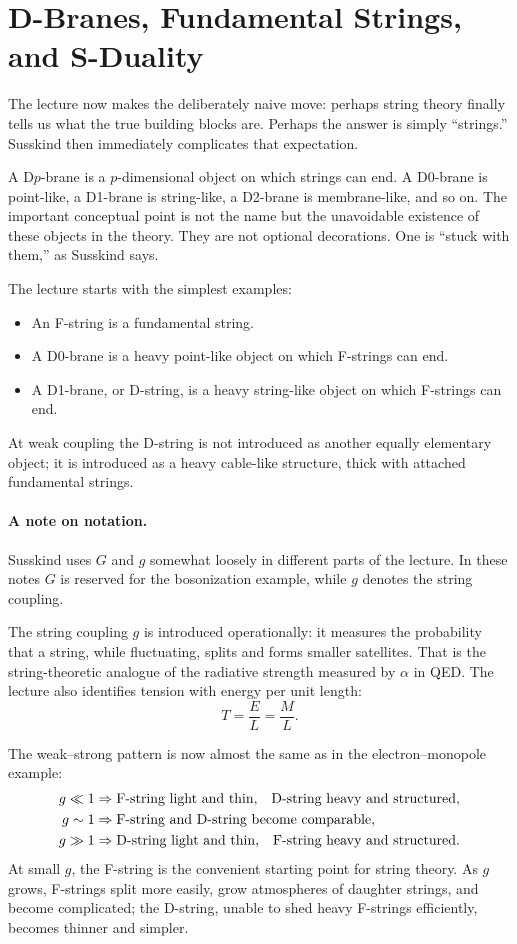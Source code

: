 \section{D-Branes, Fundamental Strings, and S-Duality}

The lecture now makes the deliberately naive move: perhaps string theory finally tells us what the true building blocks are. Perhaps the answer is simply ``strings.'' Susskind then immediately complicates that expectation.

A D\(p\)-brane is a \(p\)-dimensional object on which strings can end. A D0-brane is point-like, a D1-brane is string-like, a D2-brane is membrane-like, and so on. The important conceptual point is not the name but the unavoidable existence of these objects in the theory. They are not optional decorations. One is ``stuck with them,'' as Susskind says.

The lecture starts with the simplest examples:
\begin{itemize}
\item An F-string is a fundamental string.
\item A D0-brane is a heavy point-like object on which F-strings can end.
\item A D1-brane, or D-string, is a heavy string-like object on which F-strings can end.
\end{itemize}
At weak coupling the D-string is not introduced as another equally elementary object; it is introduced as a heavy cable-like structure, thick with attached fundamental strings.

\paragraph{A note on notation.}
Susskind uses \(G\) and \(g\) somewhat loosely in different parts of the lecture. In these notes \(G\) is reserved for the bosonization example, while \(g\) denotes the string coupling.

The string coupling \(g\) is introduced operationally: it measures the probability that a string, while fluctuating, splits and forms smaller satellites. That is the string-theoretic analogue of the radiative strength measured by \(\alpha\) in QED. The lecture also identifies tension with energy per unit length:
\begin{equation}
T=\frac{E}{L}=\frac{M}{L}.
\end{equation}

The weak--strong pattern is now almost the same as in the electron--monopole example:
\begin{align}
g\ll 1
&\Rightarrow
\text{F-string light and thin,\quad D-string heavy and structured},\\
g\sim 1
&\Rightarrow
\text{F-string and D-string become comparable},\\
g\gg 1
&\Rightarrow
\text{D-string light and thin,\quad F-string heavy and structured}.
\end{align}
At small \(g\), the F-string is the convenient starting point for string theory. As \(g\) grows, F-strings split more easily, grow atmospheres of daughter strings, and become complicated; the D-string, unable to shed heavy F-strings efficiently, becomes thinner and simpler.

